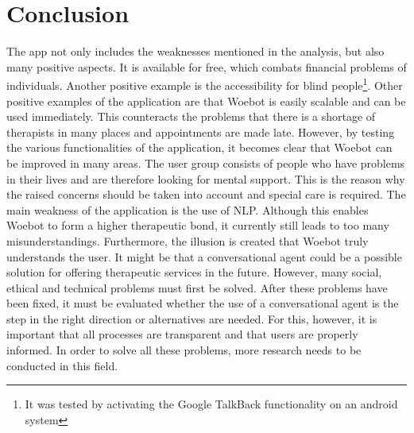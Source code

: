 \section{Conclusion}\label{sec:conclusion}
The app not only includes the weaknesses mentioned in the analysis, but also many positive aspects.
It is available for free, which combats financial problems of individuals.
Another positive example is the accessibility for blind people\footnote{It was tested by activating the Google TalkBack functionality on an android system}.
Other positive examples of the application are that Woebot is easily scalable and can be used immediately.
This counteracts the problems that there is a shortage of therapists in many places and appointments are made late.
However, by testing the various functionalities of the application, it becomes clear that Woebot can be improved in many areas.
The user group consists of people who have problems in their lives and are therefore looking for mental support.
This is the reason why the raised concerns should be taken into account and special care is required.
The main weakness of the application is the use of NLP.
Although this enables Woebot to form a higher therapeutic bond, it currently still leads to too many misunderstandings.
Furthermore, the illusion is created that Woebot truly understands the user.
It might be that a conversational agent could be a possible solution for offering therapeutic services in the future.
However, many social, ethical and technical problems must first be solved.
After these problems have been fixed, it must be evaluated whether the use of a conversational agent is the step in the right direction or alternatives are needed.
For this, however, it is important that all processes are transparent and that users are properly informed.
In order to solve all these problems, more research needs to be conducted in this field.
